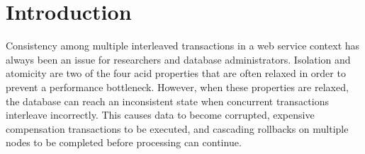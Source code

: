 \chapter{Introduction}\label{chap:intro}

Consistency among multiple interleaved transactions in a web service context has always been an issue for researchers and database administrators. Isolation and atomicity are two of the four \gls{acid} properties that are often relaxed in order to prevent a performance bottleneck. However, when these properties are relaxed, the database can reach an inconsistent state when concurrent transactions interleave incorrectly. This causes data to become corrupted, expensive compensation transactions to be executed, and cascading rollbacks on multiple nodes to be completed before processing can continue.





